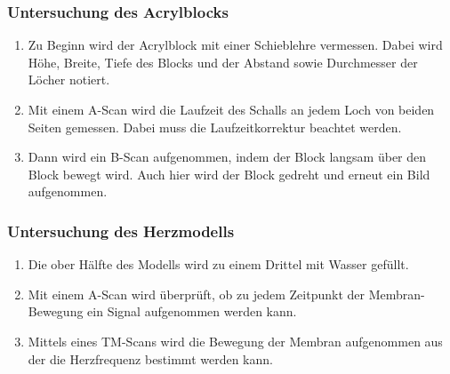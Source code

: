 \subsubsection{Untersuchung des Acrylblocks}

\begin{enumerate}
  \item Zu Beginn wird der Acrylblock mit einer Schieblehre vermessen.
    Dabei wird Höhe, Breite, Tiefe des Blocks und der Abstand sowie
    Durchmesser der Löcher notiert.
  \item Mit einem A-Scan wird die Laufzeit des Schalls an jedem Loch von beiden
    Seiten gemessen. Dabei muss die Laufzeitkorrektur beachtet werden.
  \item Dann wird ein B-Scan aufgenommen, indem der Block langsam über den
    Block bewegt wird. Auch hier wird der Block gedreht und erneut ein Bild
    aufgenommen.
\end{enumerate}

\subsubsection{Untersuchung des Herzmodells}

\begin{enumerate}
  \item Die ober Hälfte des Modells wird zu einem Drittel mit Wasser gefüllt.
  \item Mit einem A-Scan wird überprüft, ob zu jedem Zeitpunkt der Membran-Bewegung
    ein Signal aufgenommen werden kann.
  \item Mittels eines TM-Scans wird die Bewegung der Membran aufgenommen aus der die
    Herzfrequenz bestimmt werden kann.
\end{enumerate}

